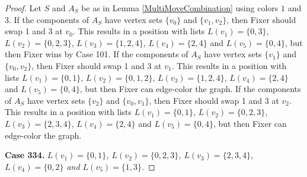 \documentclass[12pt]{amsart}
\theoremstyle{plain}
\theoremstyle{definition}
\theoremstyle{remark}
\begin{document}
\begin{proof}
Let $S$ and $A_S$ be as in Lemma \ref{MultiMoveCombination} using colors $1$ and $3$. If the components of $A_S$ have vertex sets $\{v_0\}$ and $\{v_1, v_2\}$, then Fixer should swap 1 and 3 at $v_0$. This results in a position with lists $L(v_1) = \{0, 3\}$, $L(v_2) = \{0, 2, 3\}$, $L(v_3) = \{1, 2, 4\}$, $L(v_4) = \{2, 4\}$ and $L(v_5) = \{0, 4\}$, but then Fixer wins by Case 101. If the components of $A_S$ have vertex sets $\{v_1\}$ and $\{v_0, v_2\}$, then Fixer should swap 1 and 3 at $v_1$. This results in a position with lists $L(v_1) = \{0, 1\}$, $L(v_2) = \{0, 1, 2\}$, $L(v_3) = \{1, 2, 4\}$, $L(v_4) = \{2, 4\}$ and $L(v_5) = \{0, 4\}$, but then Fixer can edge-color the graph. If the components of $A_S$ have vertex sets $\{v_2\}$ and $\{v_0, v_1\}$, then Fixer should swap 1 and 3 at $v_2$. This results in a position with lists $L(v_1) = \{0, 1\}$, $L(v_2) = \{0, 2, 3\}$, $L(v_3) = \{2, 3, 4\}$, $L(v_4) = \{2, 4\}$ and $L(v_5) = \{0, 4\}$, but then Fixer can edge-color the graph. 

\noindent\textbf{Case 334.  }\textit{$L(v_1) = \{0, 1\}$, $L(v_2) = \{0, 2, 3\}$, $L(v_3) = \{2, 3, 4\}$, $L(v_4) = \{0, 2\}$ and $L(v_5) = \{1, 3\}$.}


\end{proof}
\end{document}
